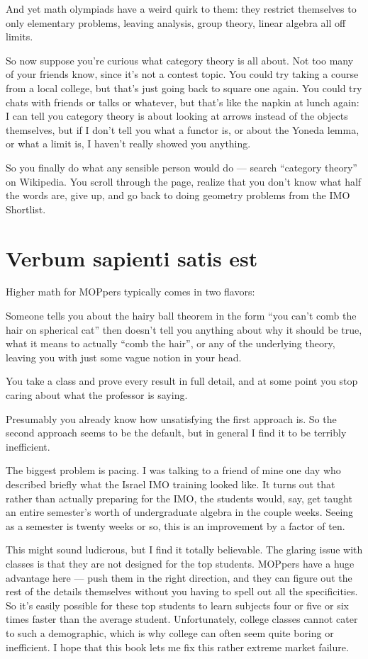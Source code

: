 And yet math olympiads have a weird quirk to them:
they restrict themselves to only elementary problems,
leaving analysis, group theory, linear algebra all off limits.

So now suppose you're curious what category theory is all about.
Not too many of your friends know, since it's not a contest topic.
You could try taking a course from a local college, but that's just going back to square one again.
You could try chats with friends or talks or whatever, but that's like the napkin at lunch again:
I can tell you category theory is about looking at arrows instead of the objects themselves,
but if I don't tell you what a functor is, or about the Yoneda lemma,
or what a limit is, I haven't really showed you anything.

So you finally do what any sensible person would do --- search ``category theory'' on Wikipedia.
You scroll through the page, realize that you don't know what half the words are,
give up, and go back to doing geometry problems from the IMO Shortlist.

\section*{Verbum sapienti satis est}
Higher math for MOPpers typically comes in two flavors:
\begin{itemize}
	\ii Someone tells you about the hairy ball theorem in the form ``you can't comb the hair on spherical cat''
	then doesn't tell you anything about why it should be true, what it means to actually ``comb the hair'', 
	or any of the underlying theory, leaving you with just some vague notion in your head.

	\ii You take a class and prove every result in full detail, and at some point
	you stop caring about what the professor is saying.
\end{itemize}
Presumably you already know how unsatisfying the first approach is.
So the second approach seems to be the default,
but in general I find it to be terribly inefficient.

The biggest problem is pacing.
I was talking to a friend of mine one day who described briefly
what the Israel IMO training looked like.
It turns out that rather than actually preparing for the IMO,
the students would, say, get taught an entire semester's worth of
undergraduate algebra in the couple weeks.
Seeing as a semester is twenty weeks or so, this is an improvement
by a factor of ten.

This might sound ludicrous, but I find it totally believable.
The glaring issue with classes is that they are not designed for the top students.
MOPpers have a huge advantage here --- push them in the right direction,
and they can figure out the rest of the details themselves
without you having to spell out all the specificities.
So it's easily possible for these top students to learn subjects
four or five or six times faster than the average student.
Unfortunately, college classes cannot cater to such a demographic,
which is why college can often seem quite boring or inefficient.
I hope that this book lets me fix this rather extreme market failure.

